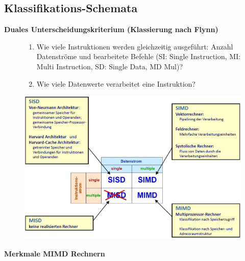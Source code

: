 \subsection{Klassifikations-Schemata}
\textbf{Duales Unterscheidungskriterium (Klassierung nach Flynn)}
\begin{figure}[htbp]
	
	\begin{minipage}{0.45\textwidth}		
		\begin{enumerate}[noitemsep,topsep=0pt]
			\item Wie viele Instruktionen werden gleichzeitig ausgeführt: Anzahl Datenströme und bearbeitete Befehle (SI: Single Instruction, MI: Multi Instruction, SD: Single Data, MD Mul)?
			
			\item Wie viele Datenwerte verarbeitet eine Instruktion?
		\end{enumerate}	
	\end{minipage}
	\hfill		
	\begin{minipage}{0.5\textwidth} 
		\includegraphics[width=\textwidth]{images/Rechnerarchitekturen/Klassierung_uP.PNG}
	\end{minipage}
	
\end{figure}

\textbf{Merkmale MIMD Rechnern}

